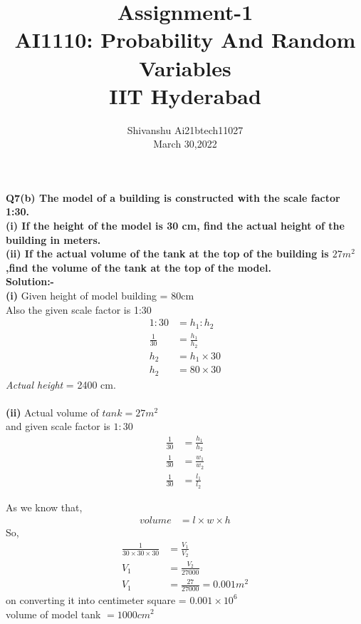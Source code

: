 \documentclass[12pt]{IEEEtran}
\title{\textbf{Assignment-1}\\ \large AI1110: Probability And Random Variables\\ IIT Hyderabad}
\author{Shivanshu  Ai21btech11027\\ March 30,2022}
\begin{document}
 \maketitle
 \textbf{Q7(b)\hspace{1mm} The model of a building is constructed with the scale factor 1:30.}\\
 
 \textbf{(i) If the height of the model is 30 cm, find the actual height of the building in meters.}\\
 
 \textbf{(ii) If the actual volume of the tank at the top of the building is $ 27m^2 $,find the volume of the tank at the top of the model.}\\
 
 \textbf{Solution:-}\\
 \textbf{(i)}
 Given height of model building = 80cm\\
 Also the given scale factor is 1:30\\
 \begin{align}
  1 : 30 &= h_{1} : h_{2}\\
  \frac{1}{30} &= \frac{h_{1}}{h_{2}}\\
  h_{2} &= h_{1}\times 30\\
  h_{2} &= 80 \times 30
 \end{align}
 \textit{Actual height} = 2400 cm.\\
 \\ 
 \textbf{(ii)}
 Actual volume of $tank = 27m^2 $\\
 and given  scale factor is $ 1:30 $\\

 \begin{align}
  \frac{1}{30} &= \frac{h_{1}}{h_{2}}\\
  \frac{1}{30} &= \frac{w_{1}}{w_{2}}\\
  \frac{1}{30} &= \frac{l_{1}}{l_{2}}
 \end{align}

 As we know that,
 \begin{align}
  volume &= l\times w\times h
 \end{align}
 So,
 \begin{align}
  \frac{1}{30\times30\times30} &= \frac{V_{1}}{V_{2}} \\
  V_{1} &= \frac{V_{2}}{27000} \\
  V_{1} &= \frac{27}{27000} = 0.001m^2
 \end{align}
 on converting it into centimeter square = $0.001 \times 10^6$\\
 volume of model tank $= 1000 cm^2$\\
\end{document}
